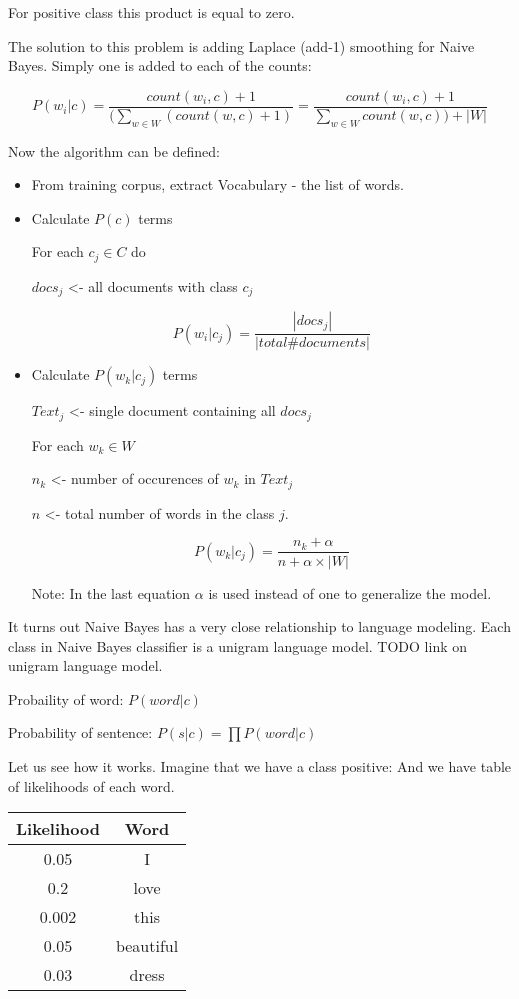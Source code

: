 \documentclass[12pt]{report}
\begin{document}
For positive class this product is equal to zero.

The solution to this problem is adding Laplace (add-1) smoothing for Naive Bayes. Simply one is added to each of the counts:

$$P(w_i | c) = \dfrac{count(w_i, c) + 1}{(\sum_{w \in W} {(count(w, c) + 1)}} = \dfrac{count(w_i, c) + 1}{\sum_{w \in W} {count(w, c)}) + |W|}$$


Now the algorithm can be defined:

\begin{itemize}
  \item From training corpus, extract Vocabulary - the list of words.
  \item Calculate $P(c)$ terms
    
   For each $c_j \in C$ do
  
      $docs_j$ <- all documents with class $c_j$ 

$$P(w_i | c_j) = \dfrac{|docs_j|}{|total \# documents|}$$

  \item Calculate $P(w_k | c_j)$ terms

$Text_j$ <- single document containing all $docs_j$

For each $w_k \in W$

$n_k$ <- number of occurences of $w_k$ in $Text_j$

$n$ <- total number of words in the class $j$.

$$P(w_k | c_j) = \dfrac{n_k + \alpha}{n + \alpha \times |W|}$$

Note: In the last equation $\alpha$ is used instead of one to generalize the model.
\end{itemize}

It turns out Naive Bayes has a very close relationship to language modeling.
Each class in Naive Bayes classifier is a unigram language model. TODO link on unigram language model.

Probaility of word: $P(word | c)$

Probability of sentence: $P(s | c) = \prod{}{P(word | c)}$

Let us see how it works. Imagine that we have a class positive:
And we have table of likelihoods of each word.

\begin{center}
  \begin{tabular}{ c | c }
    \hline
    Likelihood & Word \\ \hline
    0.05 & I \\ \hline
    0.2 & love \\ \hline
    0.002 & this \\ \hline
    0.05 & beautiful \\ \hline
    0.03 & dress \\ \hline
  \end{tabular}
\end{center}
\end{document}
